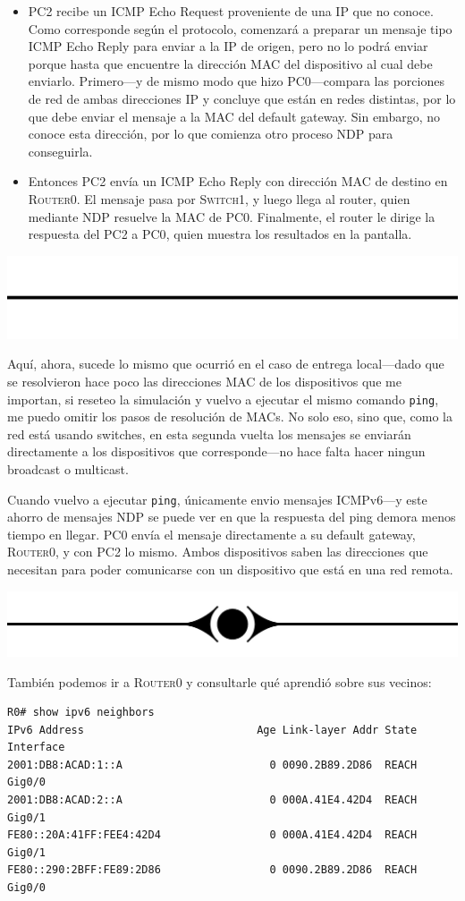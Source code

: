 \documentclass[a4paper,10pt]{corsage}
\makeatletter
\newcommand{\devname}[1]{\textsc{#1}}
\newcommand*{\@doendeq}{%
	\everypar{{\setbox\z@\lastbox}\everypar{}}%
}
\newcommand{\rest}{%
	\par\vspace{0.5\baselineskip}%
	\centerline{\includegraphics[height=\baselineskip]{rest}}%
	\vspace{\parskip}\vspace*{-\parskip}%
	\ignorespacesafterend\par\noindent\aftergroup%
}
\newcommand{\pant}{%
	\par\vspace*{-\parskip}\vspace{0.8\baselineskip}%
	\centerline{\includegraphics[height=\baselineskip]{pant}}%
	\vspace*{-\parskip}\vspace{0.8\parskip}%
	\ignorespacesafterend\par\noindent\aftergroup
}
\newenvironment{console}{%
	\begin{tcolorbox}[
		left skip=1cm,
		right skip=1Cm,
		left=8pt,
		right=8pt,
		top=2.5\parskip,
		bottom=2\parskip,
		colback=gray!10,
		colframe=gray!40,
		boxrule=0pt,
		leftrule=4pt,
		sharp corners=all,
		fontupper=\ttfamily\flushleft\footnotesize
	]%
}{%
	\end{tcolorbox}%
	\ignorespacesafterend\par\noindent\aftergroup\@doendeq%
}
\makeatother
\begin{document}
\begin{itemize}
			\item \devname{PC2} recibe un ICMP Echo Request proveniente de una IP que no conoce.  Como corresponde según el protocolo, comenzará a preparar un mensaje tipo ICMP Echo Reply para enviar a la IP de origen, pero no lo podrá enviar porque hasta que encuentre la dirección MAC del dispositivo al cual debe enviarlo.  Primero---y de mismo modo que hizo \devname{PC0}---compara las porciones de red de ambas direcciones IP y concluye que están en redes distintas, por lo que debe enviar el mensaje a la MAC del default gateway.  Sin embargo, no conoce esta dirección, por lo que comienza otro proceso NDP para conseguirla.

			\item Entonces \devname{PC2} envía un ICMP Echo Reply con dirección MAC de destino en \devname{Router0}.  El mensaje pasa por \devname{Switch1}, y luego llega al router, quien mediante NDP resuelve la MAC de \devname{PC0}.  Finalmente, el router le dirige la respuesta del \devname{PC2} a \devname{PC0}, quien muestra los resultados en la pantalla.
		\end{itemize}

		\pant

		Aquí, ahora, sucede lo mismo que ocurrió en el caso de entrega local---dado que se resolvieron hace poco las direcciones MAC de los dispositivos que me importan, si reseteo la simulación y vuelvo a ejecutar el mismo comando \texttt{ping}, me puedo omitir los pasos de resolución de MACs.  No solo eso, sino que, como la red está usando switches, en esta segunda vuelta los mensajes se enviarán directamente a los dispositivos que corresponde---no hace falta hacer ningun broadcast o multicast.

		Cuando vuelvo a ejecutar \texttt{ping}, únicamente envio mensajes ICMPv6---y este ahorro de mensajes NDP se puede ver en que la respuesta del ping demora menos tiempo en llegar.  \devname{PC0} envía el mensaje directamente a su default gateway, \devname{Router0}, y con \devname{PC2} lo mismo.  Ambos dispositivos saben las direcciones que necesitan para poder comunicarse con un dispositivo que está en una red remota.

		\rest

		También podemos ir a \devname{Router0} y consultarle qué aprendió sobre sus vecinos:
		\begin{console}
			\begin{verbatim}R0# show ipv6 neighbors
IPv6 Address                           Age Link-layer Addr State Interface
2001:DB8:ACAD:1::A                       0 0090.2B89.2D86  REACH Gig0/0
2001:DB8:ACAD:2::A                       0 000A.41E4.42D4  REACH Gig0/1
FE80::20A:41FF:FEE4:42D4                 0 000A.41E4.42D4  REACH Gig0/1
FE80::290:2BFF:FE89:2D86                 0 0090.2B89.2D86  REACH Gig0/0\end{verbatim}
		\end{console}
\end{document}

